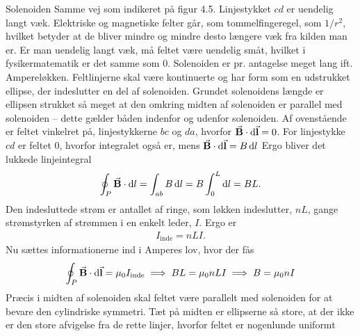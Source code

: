 \documentclass[crop=false, class=memoir]{standalone}
\begin{document}
\begin{opgave}{Solenoiden}
    \opg Samme vej som indikeret på figur 4.5.
    \opg Linjestykket $cd$ er uendelig langt væk. Elektriske og magnetiske felter går, som tommelfingeregel, som $1/r^2$, hvilket betyder at de bliver mindre og mindre desto længere væk fra kilden man er. Er man uendelig langt væk, må feltet være uendelig småt, hvilket i fysikermatematik er det samme som 0.
    \opg Solenoiden er pr. antagelse meget lang ift. Ampereløkken. Feltlinjerne skal være kontinuerte og har form som en udstrukket ellipse, der indeslutter en del af solenoiden. Grundet solenoidens længde er ellipsen strukket så meget at den omkring midten af solenoiden er parallel med solenoiden -- dette gælder båden indenfor og udenfor solenoiden.
    \opg Af ovenstående er feltet vinkelret på, linjestykkerne $bc$ og $da$, hvorfor $\va B \cdot \dd{\va l} = 0$. For linjestykke $cd$ er feltet 0, hvorfor integralet også er, mens $\va B \cdot \dd{\va l} = B\dd{l}$ Ergo bliver det lukkede linjeintegral
    \begin{align*}
        \oint_P \va B \cdot \dd{l} = \int_{ab} B\dd{l} = B\int_0^L \dd{l} = BL.
    \end{align*}
    \opg Den indesluttede strøm er antallet af ringe, som løkken indeslutter, $nL$, gange strømstyrken af strømmen i en enkelt leder, $I$. Ergo er
    \begin{align*}
        I_\mathrm{inde} = nLI.
    \end{align*}
    \opg Nu sættes informationerne ind i Amperes lov, hvor der fås
    \begin{align*}
        \oint_P \va B \cdot \dd{\va{l}} = \mu_0 I_\mathrm{inde} \implies BL = \mu_0nLI \implies B = \mu_0nI
    \end{align*}
    \opg Præcis i midten af solenoiden skal feltet være parallelt med solenoiden for at bevare den cylindriske symmetri. Tæt på midten er ellipserne så store, at der ikke er den store afvigelse fra de rette linjer, hvorfor feltet er nogenlunde uniformt
\end{opgave}
\end{document}
